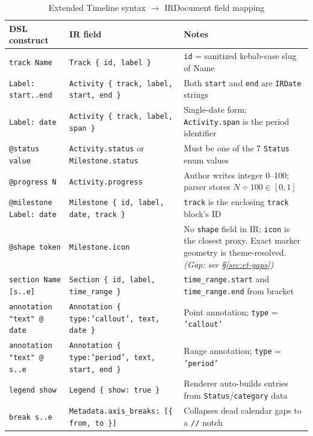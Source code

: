 \begin{table}[h]
\centering\small
\caption{Extended Timeline syntax $\rightarrow$ IRDocument field mapping}
\label{tab:et-ir-mapping}
\begin{tabular}{p{3.8cm}p{4.2cm}p{5.0cm}}
\toprule
\textbf{DSL construct} & \textbf{IR field} & \textbf{Notes} \\
\midrule
\texttt{track Name}
  & \texttt{Track \{ id, label \}}
  & \texttt{id} = sanitized kebab-case slug of Name \\
\addlinespace
\texttt{Label: start..end}
  & \texttt{Activity \{ track, label,} \texttt{start, end \}}
  & Both \texttt{start} and \texttt{end} are \texttt{IRDate} strings \\
\addlinespace
\texttt{Label: date}
  & \texttt{Activity \{ track, label, span \}}
  & Single-date form; \texttt{Activity.span} is the period identifier \\
\addlinespace
\texttt{@status value}
  & \texttt{Activity.status} or \texttt{Milestone.status}
  & Must be one of the 7 \texttt{Status} enum values \\
\addlinespace
\texttt{@progress N}
  & \texttt{Activity.progress}
  & Author writes integer 0--100; parser stores $N \div 100 \in [0,1]$ \\
\addlinespace
\texttt{@milestone Label: date}
  & \texttt{Milestone \{ id, label, date, track \}}
  & \texttt{track} is the enclosing \texttt{track} block's ID \\
\addlinespace
\texttt{@shape token}
  & \texttt{Milestone.icon}
  & No \texttt{shape} field in IR; \texttt{icon} is the closest proxy.
    Exact marker geometry is theme-resolved.
    \emph{(Gap: see \S\ref{sec:et-gaps})} \\
\addlinespace
\texttt{section Name [s..e]}
  & \texttt{Section \{ id, label, time\_range \}}
  & \texttt{time\_range.start} and \texttt{time\_range.end} from bracket \\
\addlinespace
\texttt{annotation "text" @ date}
  & \texttt{Annotation \{ type:'callout', text, date \}}
  & Point annotation; \texttt{type} = \texttt{'callout'} \\
\addlinespace
\texttt{annotation "text" @ s..e}
  & \texttt{Annotation \{ type:'period', text, start, end \}}
  & Range annotation; \texttt{type} = \texttt{'period'} \\
\addlinespace
\texttt{legend show}
  & \texttt{Legend \{ show: true \}}
  & Renderer auto-builds entries from \texttt{Status}/\texttt{category} data \\
\addlinespace
\texttt{break s..e}
  & \texttt{Metadata.axis\_breaks: [\{ from, to \}]}
  & Collapses dead calendar gaps to a \texttt{//} notch \\
\bottomrule
\end{tabular}
\end{table}

